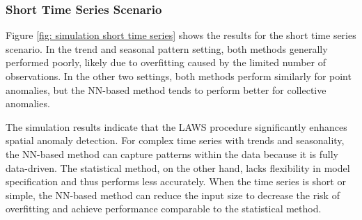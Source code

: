 \documentclass[11pt]{article}
\begin{document}
\subsubsection*{Short Time Series Scenario}
Figure \ref{fig: simulation short time series} shows the results for the short time series scenario. In the trend and seasonal pattern setting, both methods generally performed poorly, likely due to overfitting caused by the limited number of observations. In the other two settings, both methods perform similarly for point anomalies, but the NN-based method tends to perform better for collective anomalies. 


The simulation results indicate that the LAWS procedure significantly enhances spatial anomaly detection. For complex time series with trends and seasonality, the NN-based method can capture patterns within the data because it is fully data-driven. The statistical method, on the other hand, lacks flexibility in model specification and thus performs less accurately. When the time series is short or simple, the NN-based method can reduce the input size to decrease the risk of overfitting and achieve performance comparable to the statistical method.
\end{document}
